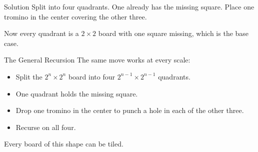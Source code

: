\documentclass[10pt,aspectratio=169]{beamer}
\begin{document}
\begin{frame}{Solution}
  Split into four quadrants. One already has the missing square.
  Place \alert{one tromino in the center} covering the other three.

  \bigskip
  \begin{center}
  \end{center}

  \bigskip
  Now every quadrant is a $2 \times 2$ board with one square missing, which is the base case.
\end{frame}

\begin{frame}{The General Recursion}
  The same move works at every scale:

  \bigskip
  \begin{itemize}
    \item Split the $2^n \times 2^n$ board into four $2^{n-1} \times 2^{n-1}$ quadrants.
    \item One quadrant holds the missing square.
    \item Drop one tromino in the center to punch a hole in each of the other three.
    \item Recurse on all four.
  \end{itemize}

  \bigskip
  \begin{center}
    Every board of this shape can be tiled.
  \end{center}
\end{frame}

\end{document}
